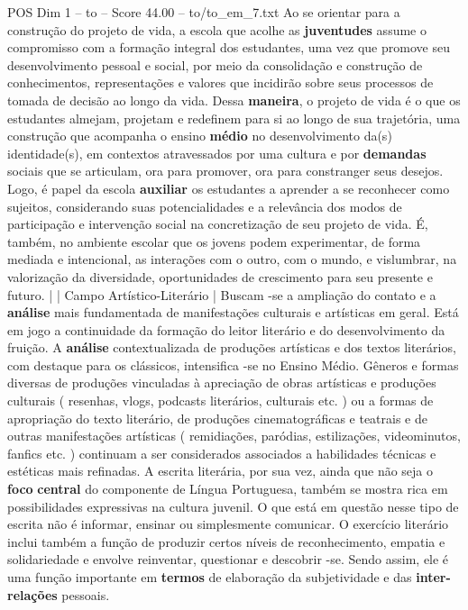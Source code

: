 \begin{textsample}{POS Dim 1 – to – Score 44.00 – to/to\_em\_7.txt}
Ao se orientar para a construção do projeto de vida, a escola que acolhe as \textbf{juventudes} assume o compromisso com a formação integral dos estudantes, uma vez que promove seu desenvolvimento pessoal e social, por meio da consolidação e construção de conhecimentos, representações e valores que incidirão sobre seus processos de tomada de decisão ao longo da vida.
Dessa \textbf{maneira}, o projeto de vida é o que os estudantes almejam, projetam e redefinem para si ao longo de sua trajetória, uma construção que acompanha o ensino \textbf{médio} no desenvolvimento da(s) identidade(s), em contextos atravessados por uma cultura e por \textbf{demandas} sociais que se articulam, ora para promover, ora para constranger seus desejos.
Logo, é papel da escola \textbf{auxiliar} os estudantes a aprender a se reconhecer como sujeitos, considerando suas potencialidades e a relevância dos modos de participação e intervenção social na concretização de seu projeto de vida.
É, também, no ambiente escolar que os jovens podem experimentar, de forma mediada e intencional, as interações com o outro, com o mundo, e vislumbrar, na valorização da diversidade, oportunidades de crescimento para seu presente e futuro. | | Campo Artístico-Literário | Buscam -se a ampliação do contato e a \textbf{análise} mais fundamentada de manifestações culturais e artísticas em geral.
Está em jogo a continuidade da formação do leitor literário e do desenvolvimento da fruição.
A \textbf{análise} contextualizada de produções artísticas e dos textos literários, com destaque para os clássicos, intensifica -se no Ensino Médio.
Gêneros e formas diversas de produções vinculadas à apreciação de obras artísticas e produções culturais ( resenhas, vlogs, podcasts literários, culturais etc. ) ou a formas de apropriação do texto literário, de produções cinematográficas e teatrais e de outras manifestações artísticas ( remidiações, paródias, estilizações, videominutos, fanfics etc. ) continuam a ser considerados associados a habilidades técnicas e estéticas mais refinadas.
A escrita literária, por sua vez, ainda que não seja o \textbf{foco} \textbf{central} do componente de Língua Portuguesa, também se mostra rica em possibilidades expressivas na cultura juvenil.
O que está em questão nesse tipo de escrita não é informar, ensinar ou simplesmente comunicar.
O exercício literário inclui também a função de produzir certos níveis de reconhecimento, empatia e solidariedade e envolve reinventar, questionar e descobrir -se.
Sendo assim, ele é uma função importante em \textbf{termos} de elaboração da subjetividade e das \textbf{inter-relações} pessoais.

\end{textsample}

